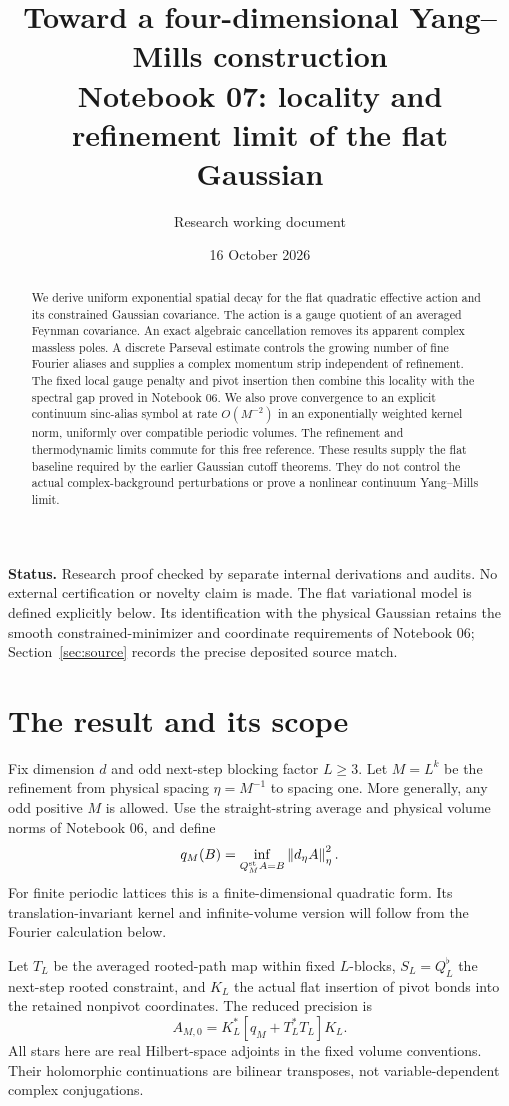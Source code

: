 \documentclass[11pt]{article}
\title{Toward a four-dimensional Yang--Mills construction\\
\large Notebook 07: locality and refinement limit of the flat Gaussian}
\author{Research working document}
\date{16 October 2026}
\theoremstyle{remark}
\newcommand{\norm}[1]{\left\|#1\right\|}
\begin{document}
\maketitle

\begin{abstract}
We derive uniform exponential spatial decay for the flat quadratic
effective action and its constrained Gaussian covariance. The action
is a gauge quotient of an averaged Feynman covariance. An exact
algebraic cancellation removes its apparent complex massless poles.
A discrete Parseval estimate controls the growing number of fine
Fourier aliases and supplies a complex momentum strip independent of
refinement. The fixed local gauge penalty and pivot insertion then
combine this locality with the spectral gap proved in Notebook 06.
We also prove convergence to an explicit continuum sinc-alias symbol
at rate $O(M^{-2})$ in an exponentially weighted kernel norm, uniformly
over compatible periodic volumes. The refinement and thermodynamic
limits commute for this free reference. These results supply the flat
baseline required by the earlier Gaussian cutoff theorems. They do not
control the actual complex-background perturbations or prove a nonlinear
continuum Yang--Mills limit.
\end{abstract}

\noindent\textbf{Status.}
Research proof checked by separate internal derivations and audits.
No external certification or novelty claim is made.
The flat variational model is defined explicitly
below. Its identification with the physical Gaussian retains the
smooth constrained-minimizer and coordinate requirements of Notebook 06;
Section~\ref{sec:source} records the precise deposited source match.

\section{The result and its scope}

Fix dimension $d$ and odd next-step blocking factor $L\ge3$.
Let $M=L^k$ be the refinement from physical spacing $\eta=M^{-1}$
to spacing one. More generally, any odd positive $M$ is allowed.
Use the straight-string average and physical volume norms of Notebook 06,
and define
\[
 q_M(B)=\inf_{Q_M^{\rm st}A=B}\norm{d_\eta A}_\eta^2.
\]
For finite periodic lattices this is a finite-dimensional quadratic
form. Its translation-invariant kernel and infinite-volume version
will follow from the Fourier calculation below.

Let $T_L$ be the averaged rooted-path map within fixed $L$-blocks,
$S_L=Q_L^\flat$ the next-step rooted constraint, and $K_L$ the
actual flat insertion of pivot bonds into the retained nonpivot
coordinates. The reduced precision is
\begin{equation}\label{eq:reduced}
 A_{M,0}=K_L^*[q_M+T_L^*T_L]K_L.
\end{equation}
All stars here are real Hilbert-space adjoints in the fixed volume
conventions. Their holomorphic continuations are bilinear transposes,
not variable-dependent complex conjugations.
\end{document}
